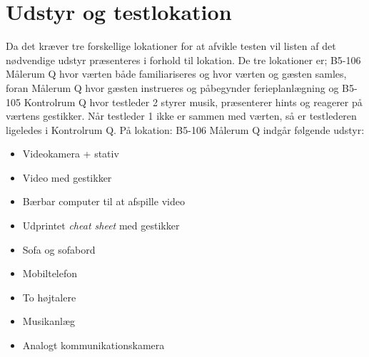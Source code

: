 \section{Udstyr og testlokation}
\label{UdstyrLokationSocialAccept}
%
Da det kræver tre forskellige lokationer for at afvikle testen vil listen af det nødvendige udstyr præsenteres i forhold til lokation. De tre lokationer er; B5-106 Målerum Q hvor værten både familiariseres og hvor værten og gæsten samles, foran Målerum Q hvor gæsten instrueres og påbegynder ferieplanlægning og B5-105 Kontrolrum Q hvor testleder 2 styrer musik, præsenterer hints og reagerer på værtens gestikker. Når testleder 1 ikke er sammen med værten, så er testlederen ligeledes i Kontrolrum Q. \blankline
%
På lokation: B5-106 Målerum Q indgår følgende udstyr: 
\begin{itemize}
\item Videokamera + stativ
\item Video med gestikker
\item Bærbar computer til at afspille video
\item Udprintet \textit{cheat sheet} med gestikker
\item Sofa og sofabord
\item Mobiltelefon
\item To højtalere 
\item Musikanlæg
\item Analogt kommunikationskamera\blankline
\noindent
\end{itemize}
%
